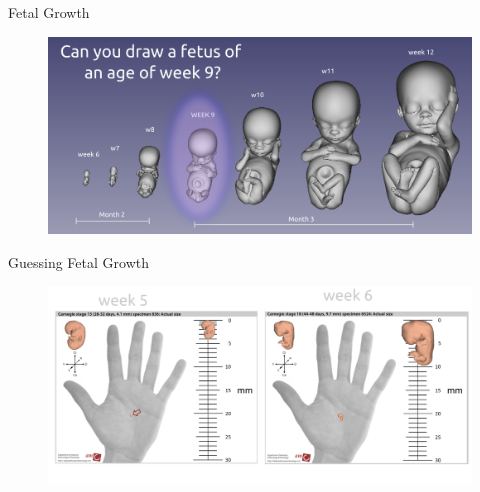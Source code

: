 {
\begin{frame}{Fetal Growth}
      \begin{figure}
        \centering
        \includegraphics[width=1.0\textwidth]{./figures/fetal-growth/versions/drawing-v02.png}
      \end{figure}
\end{frame}
}







{
\begin{frame}{Guessing Fetal Growth}
      \begin{figure}
        \centering
        \includegraphics[width=1.0\textwidth]{./figures/fetal-size/versions/drawing-v01.png}
      \end{figure}
\end{frame}
}




